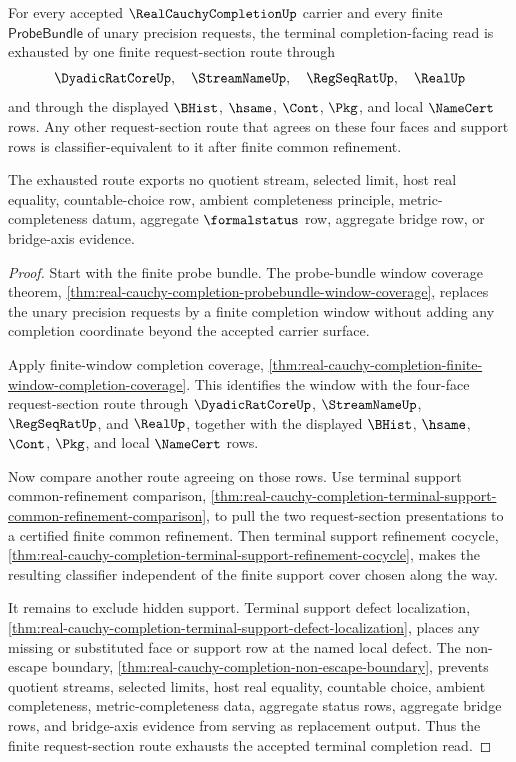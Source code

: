 \begin{theorem}
\label{thm:real-cauchy-completion-request-section-terminal-exhaustion}
For every accepted $\RealCauchyCompletionUp$ carrier and every finite $\mathsf{ProbeBundle}$ of unary precision requests, the terminal completion-facing read is exhausted by one finite request-section route through
$$
\DyadicRatCoreUp,\quad \StreamNameUp,\quad \RegSeqRatUp,\quad \RealUp
$$
and through the displayed $\BHist$, $\hsame$, $\Cont$, $\Pkg$, and local $\NameCert$ rows. Any other request-section route that agrees on these four faces and support rows is classifier-equivalent to it after finite common refinement.

The exhausted route exports no quotient stream, selected limit, host real equality, countable-choice row, ambient completeness principle, metric-completeness datum, aggregate $\formalstatus$ row, aggregate bridge row, or bridge-axis evidence.
\end{theorem}
\begin{proof}
Start with the finite probe bundle. The probe-bundle window coverage theorem, \autoref{thm:real-cauchy-completion-probebundle-window-coverage}, replaces the unary precision requests by a finite completion window without adding any completion coordinate beyond the accepted carrier surface.

Apply finite-window completion coverage, \autoref{thm:real-cauchy-completion-finite-window-completion-coverage}. This identifies the window with the four-face request-section route through $\DyadicRatCoreUp$, $\StreamNameUp$, $\RegSeqRatUp$, and $\RealUp$, together with the displayed $\BHist$, $\hsame$, $\Cont$, $\Pkg$, and local $\NameCert$ rows.

Now compare another route agreeing on those rows. Use terminal support common-refinement comparison, \autoref{thm:real-cauchy-completion-terminal-support-common-refinement-comparison}, to pull the two request-section presentations to a certified finite common refinement. Then terminal support refinement cocycle, \autoref{thm:real-cauchy-completion-terminal-support-refinement-cocycle}, makes the resulting classifier independent of the finite support cover chosen along the way.

It remains to exclude hidden support. Terminal support defect localization, \autoref{thm:real-cauchy-completion-terminal-support-defect-localization}, places any missing or substituted face or support row at the named local defect. The non-escape boundary, \autoref{thm:real-cauchy-completion-non-escape-boundary}, prevents quotient streams, selected limits, host real equality, countable choice, ambient completeness, metric-completeness data, aggregate status rows, aggregate bridge rows, and bridge-axis evidence from serving as replacement output. Thus the finite request-section route exhausts the accepted terminal completion read.
\end{proof}

